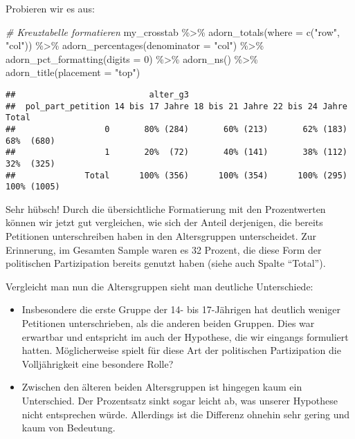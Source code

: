 \documentclass[
]{book}
\newenvironment{Shaded}{\begin{snugshade}}{\end{snugshade}}
\newcommand{\AttributeTok}[1]{\textcolor[rgb]{0.77,0.63,0.00}{#1}}
\newcommand{\CommentTok}[1]{\textcolor[rgb]{0.56,0.35,0.01}{\textit{#1}}}
\newcommand{\DecValTok}[1]{\textcolor[rgb]{0.00,0.00,0.81}{#1}}
\newcommand{\FunctionTok}[1]{\textcolor[rgb]{0.00,0.00,0.00}{#1}}
\newcommand{\NormalTok}[1]{#1}
\newcommand{\SpecialCharTok}[1]{\textcolor[rgb]{0.00,0.00,0.00}{#1}}
\newcommand{\StringTok}[1]{\textcolor[rgb]{0.31,0.60,0.02}{#1}}
\begin{document}
Probieren wir es aus:

\begin{Shaded}
\begin{Highlighting}[]
\CommentTok{\# Kreuztabelle formatieren}
\NormalTok{my\_crosstab }\SpecialCharTok{\%\textgreater{}\%} 
  \FunctionTok{adorn\_totals}\NormalTok{(}\AttributeTok{where =} \FunctionTok{c}\NormalTok{(}\StringTok{"row"}\NormalTok{, }\StringTok{"col"}\NormalTok{)) }\SpecialCharTok{\%\textgreater{}\%}
  \FunctionTok{adorn\_percentages}\NormalTok{(}\AttributeTok{denominator =} \StringTok{"col"}\NormalTok{) }\SpecialCharTok{\%\textgreater{}\%} 
  \FunctionTok{adorn\_pct\_formatting}\NormalTok{(}\AttributeTok{digits =} \DecValTok{0}\NormalTok{) }\SpecialCharTok{\%\textgreater{}\%}
  \FunctionTok{adorn\_ns}\NormalTok{() }\SpecialCharTok{\%\textgreater{}\%}
  \FunctionTok{adorn\_title}\NormalTok{(}\AttributeTok{placement =} \StringTok{"top"}\NormalTok{)}
\end{Highlighting}
\end{Shaded}

\begin{verbatim}
##                           alter_g3                                            
##  pol_part_petition 14 bis 17 Jahre 18 bis 21 Jahre 22 bis 24 Jahre       Total
##                  0       80% (284)       60% (213)       62% (183)  68%  (680)
##                  1       20%  (72)       40% (141)       38% (112)  32%  (325)
##              Total      100% (356)      100% (354)      100% (295) 100% (1005)
\end{verbatim}

Sehr hübsch! Durch die übersichtliche Formatierung mit den Prozentwerten können wir jetzt gut vergleichen, wie sich der Anteil derjenigen, die bereits Petitionen unterschreiben haben in den Altersgruppen unterscheidet. Zur Erinnerung, im Gesamten Sample waren es 32 Prozent, die diese Form der politischen Partizipation bereits genutzt haben (siehe auch Spalte ``Total'').

Vergleicht man nun die Altersgruppen sieht man deutliche Unterschiede:

\begin{itemize}
\item
  Insbesondere die erste Gruppe der 14- bis 17-Jährigen hat deutlich weniger Petitionen unterschrieben, als die anderen beiden Gruppen. Dies war erwartbar und entspricht im auch der Hypothese, die wir eingangs formuliert hatten. Möglicherweise spielt für diese Art der politischen Partizipation die Volljährigkeit eine besondere Rolle?
\item
  Zwischen den älteren beiden Altersgruppen ist hingegen kaum ein Unterschied. Der Prozentsatz sinkt sogar leicht ab, was unserer Hypothese nicht entsprechen würde. Allerdings ist die Differenz ohnehin sehr gering und kaum von Bedeutung.
\end{itemize}
\end{document}
